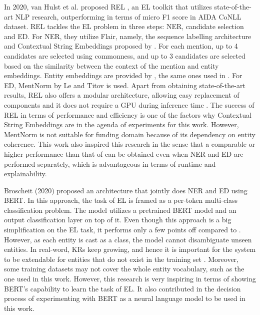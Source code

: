 \documentclass{report}
\theoremstyle{definition}
\theoremstyle{remark}
\begin{document}
In 2020, van Hulst et al. proposed REL \cite{REL}, an EL toolkit that utilizes state-of-the-art NLP research, outperforming \cite{kolitsas} in terms of micro F1 score in AIDA CoNLL dataset. REL tackles the EL problem in three steps: NER, candidate selection and ED. For NER, they utilize Flair, namely, the sequence labelling architecture and Contextual String Embeddings proposed by \cite{flairpaper}. For each mention, up to 4 candidates are selected using commonness, and up to 3 candidates are selected based on the similarity between the context of the mention and entity embeddings. Entity embeddings are provided by \cite{kolitsasEmbed}, the same ones used in \cite{kolitsas}. For ED, MentNorm by Le and Titov \cite{mentnorm} is used. Apart from obtaining state-of-the-art results, REL also offers a modular architecture, allowing easy replacement of components and it does not require a GPU during inference time \cite{REL}. The success of REL in terms of performance and efficiency is one of the factors why Contextual String Embeddings are in the agenda of experiments for this work. However, MentNorm is not suitable for funding domain because of its dependency on entity coherence. This work also inspired this research in the sense that a comparable or higher performance than that of \cite{kolitsas} can be obtained even when NER and ED are performed separately, which is advantageous in terms of runtime and explainability.

Broscheit (2020) \cite{bertEL} proposed an architecture that jointly does NER and ED using BERT. In this approach, the task of EL is framed as a per-token multi-class classification problem. The model utilizes a pretrained BERT model and an output classification layer on top of it. Even though this approach is a big simplification on the EL task, it performs only a few points off compared to \cite{kolitsas}.  However, as each entity is cast as a class, the model cannot disambiguate unseen entities. In real-word, KRs keep growing, and hence it is important for the system to be extendable for entities that do not exist in the training set \cite{gupta}. Moreover, some training datasets may not cover the whole entity vocabulary, such as the one used in this work. However, this research is very inspiring in terms of showing BERT's capability to learn the task of EL. It also contributed in the decision process of experimenting with BERT as a neural language model to be used in this work.
\end{document}
